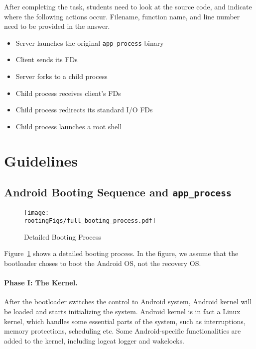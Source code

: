 After completing the task, students need to look at the source code, and indicate 
where the following actions occur. Filename, function name, and line number
need to be provided in the answer.

  
  \begin{itemize}
     \item Server launches the original \texttt{app\_process} binary
     \item Client sends its FDs
     \item Server forks to a child process
     \item Child process receives client's FDs
     \item Child process redirects its standard I/O FDs
     \item Child process launches a root shell
  \end{itemize}

 


\section{Guidelines}
\label{sec:rooting:guidelines}


\subsection{Android Booting Sequence and \texttt{app\_process}}
\label{sec:rooting:BootingSequence}


\begin{figure}[htb]
  \begin{center}
    \texttt{[image: \\rootingFigs/full\_booting\_process.pdf]}
  \end{center}
  \caption{Detailed Booting Process}
  \label{fig:rooting:bootingProcess}
\end{figure}

Figure~\ref{fig:rooting:bootingProcess} shows a detailed booting process. 
In the figure, we assume that the bootloader
choses to boot the Android OS, not the recovery OS.

\paragraph{Phase I: The Kernel.}
After the bootloader switches the control to Android system, Android kernel will be loaded and
starts initializing the system. Android kernel is in fact a Linux kernel, 
which handles some essential parts of the system, such as interruptions, memory protections,
scheduling etc. Some Android-specific functionalities are added to the kernel,
including logcat logger and wakelocks. 

